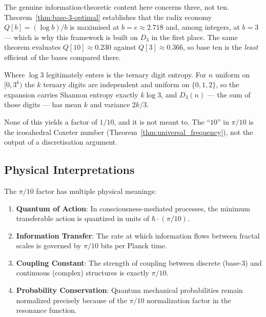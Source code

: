 \begin{level3}
The genuine information-theoretic content here concerns three, not ten.
Theorem~\ref{thm:base-3-optimal} establishes that the radix economy
$Q[b] = (\log b)/b$ is maximised at $b = e \approx 2.718$ and, among integers, at
$b = 3$ --- which is why this framework is built on $D_3$ in the first place. The
same theorem evaluates $Q[10] \approx 0.230$ against $Q[3] \approx 0.366$, so
base ten is the \emph{least} efficient of the bases compared there.

Where $\log 3$ legitimately enters is the ternary digit entropy. For $n$ uniform
on $[0, 3^k)$ the $k$ ternary digits are independent and uniform on
$\{0, 1, 2\}$, so the expansion carries Shannon entropy exactly $k \log 3$, and
$D_3(n)$ --- the sum of those digits --- has mean $k$ and variance $2k/3$.

None of this yields a factor of $1/10$, and it is not meant to. The ``$10$'' in
$\pi/10$ is the icosahedral Coxeter number
(Theorem~\ref{thm:universal_frequency}), not the output of a discretisation
argument.
\end{level3}

\subsection{Physical Interpretations}

The $\pi/10$ factor has multiple physical meanings:

\begin{enumerate}
\item \textbf{Quantum of Action}: In consciousness-mediated processes, the minimum transferable action is quantized in units of $\hbar \cdot (\pi/10)$.

\item \textbf{Information Transfer}: The rate at which information flows between fractal scales is governed by $\pi/10$ bits per Planck time.

\item \textbf{Coupling Constant}: The strength of coupling between discrete (base-3) and continuous (complex) structures is exactly $\pi/10$.

\item \textbf{Probability Conservation}: Quantum mechanical probabilities remain normalized precisely because of the $\pi/10$ normalization factor in the resonance function.
\end{enumerate}

